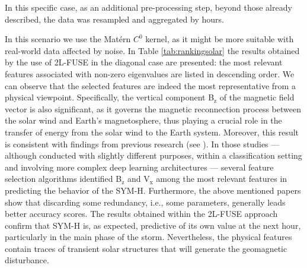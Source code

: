 \documentclass[hyphens,a4paper,11pt]{article}
\begin{document}
In this specific case, as an additional pre-processing step, beyond those already described, the data was resampled and aggregated by hours.

In this scenario we use the {Matérn} $C^0$ kernel, as it might be more suitable with real-world data affected by noise. In Table \ref{tab:rankingsolar} the results obtained by the use of 2L-FUSE in the diagonal case are presented: the most relevant features associated with non-zero eigenvalues  are listed in descending order. We can observe that the selected features are indeed the most representative from a physical viewpoint. Specifically, the vertical component B$_\mathrm{z}$ of the magnetic field vector is also significant, as it governs the magnetic reconnection process between the solar wind and Earth's magnetosphere, thus playing a crucial role in the transfer of energy from the solar wind to the Earth system. 
Moreover, this result is consistent with findings from previous research (see \cite{guastavinoetal2024,Camattari}). In those studies --- although conducted with slightly different purposes, within a classification setting and involving more complex deep learning architectures --- several feature selection algorithms identified B$_\mathrm{z}$ and V$_\mathrm{x}$ among the most relevant features in predicting the behavior of the SYM-H. Furthermore, the above mentioned papers show that discarding some redundancy, i.e., some parameters, generally leads better accuracy scores. The results obtained within the 2L-FUSE approach confirm that SYM-H is, as expected, predictive of its own value at the next hour, particularly in the main phase of the storm. Nevertheless, the physical features contain traces of transient solar structures that will generate the geomagnetic disturbance.
\end{document}
